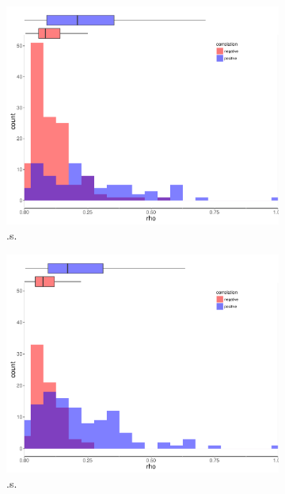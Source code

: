\begin{figure}
\begin{subfigure}[b]{0.4\textwidth}
        \includegraphics[width = 1\textwidth]{figures/combinedplotRR_ds.pdf}
        \caption{.s.}
        \label{fig:.}
    \end{subfigure}
\begin{subfigure}[b]{0.4\textwidth}
        \includegraphics[width = 1\textwidth]{figures/combinedplotRR_ws.pdf}
        \caption{.s.}
        \label{fig:.}
    \end{subfigure}
\begin{subfigure}[b]{0.4\textwidth}

\end{subfigure}
\end{figure}
